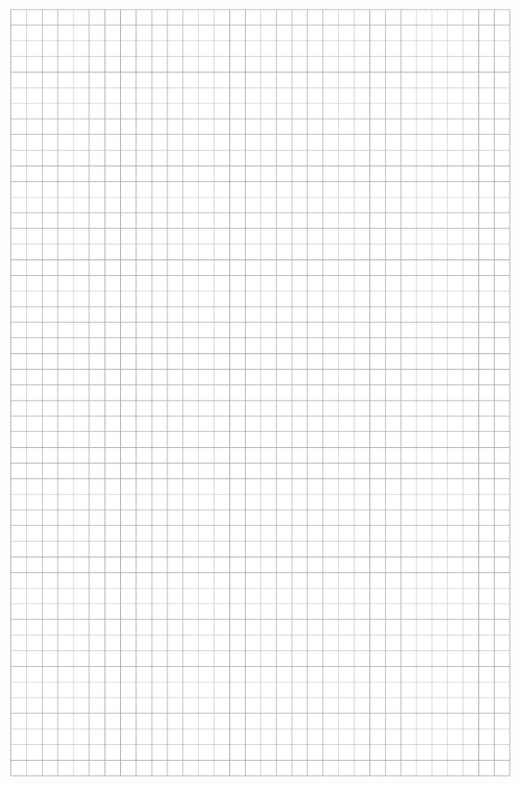 \documentclass[10pt]{article}
\begin{document}
\includegraphics[max width=\textwidth, center]{2024_11_21_51cb67544fb9b029f01cg-30}\\
\end{document}
